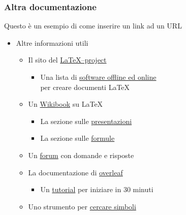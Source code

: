 \documentclass[10pt]{beamer}
\begin{document}
\begin{frame} \frametitle{Altra documentazione}
Questo è un esempio di come inserire un link ad un URL
\begin{itemize}
    \item Altre informazioni utili
    \begin{itemize}
        \item Il sito del \href{https://www.latex-project.org}{\LaTeX{}--project}
            \begin{itemize}
                \item Una lista di 
                \href{https://www.latex-project.org/get}{software offline ed online}\\
                per creare documenti \LaTeX{}
            \end{itemize}
        \item Un \href{https://en.wikibooks.org/wiki/LaTeX}{Wikibook} su \LaTeX
        \begin{itemize}
            \item La sezione sulle \href{https://en.wikibooks.org/wiki/LaTeX/Presentations}
            {presentazioni}
            \item La sezione sulle
            \href{https://en.wikibooks.org/wiki/LaTeX/Mathematics}{formule}
        \end{itemize}
        \item Un \href{https://tex.stackexchange.com/}{forum} con domande e risposte
        \item La documentazione di \href{https://it.overleaf.com/learn}{overleaf}
        \begin{itemize}
            \item Un \href{https://it.overleaf.com/learn/latex/Learn_LaTeX_in_30_minutes}
            {tutorial} per iniziare in 30 minuti
        \end{itemize}
        \item Uno strumento per \href{http://detexify.kirelabs.org/classify.html}
        {cercare simboli}
    \end{itemize}
\end{itemize}
\end{frame}
\end{document}
